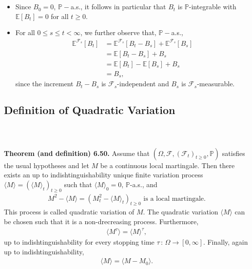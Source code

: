 \documentclass{beamer}
\numberwithin{equation}{section}
\newenvironment{frame2}{\begin{frame}\frametitle{{\normalsize \secname} \\ {\large \subsecname}}}{\end{frame}}
\begin{document}
\begin{frame2}
    \begin{itemize}
        \item Since $B_0 = 0$, $\mathbb{P}-$a.s., it follows in particular that $B_t$ is $\mathbb{P}$-integrable with $\mathbb{E}[B_t] = 0$ for all $t \geq 0$.
        \item For all $0 \leq s \leq t < \infty$, we further observe that, $\mathbb{P}-$a.s.,
        \begin{align}
            \mathbb{E}^{\mathcal{F}_s}[B_t] &= \mathbb{E}^{\mathcal{F}_s}[B_t - B_s] + \mathbb{E}^{\mathcal{F}_s}\left[B_s\right] \\
             &= \mathbb{E}[B_t - B_s] + B_s \\ 
             &= \mathbb{E}[B_t] - \mathbb{E}[B_s] + B_s \\
             &= B_s, 
        \end{align}
        since the increment $B_t - B_s$ is $\mathcal{F}_s$-independent and $B_s$ is $\mathcal{F}_s$-measurable.
    \end{itemize}
\end{frame2}

\subsection{Definition of Quadratic Variation}

\begin{frame2}
    \textbf{Theorem (and definition) 6.50.}
    Assume that $(\Omega, \mathcal{F}, (\mathcal{F}_t)_{t\geq 0},\mathbb{P})$ satisfies the usual hypotheses and let $M$ be a continuous local martingale.
    Then there exists an up to indishtinguishability unique finite variation process $\langle M \rangle = \left(\langle M \rangle_t\right)_{t\geq 0}$ such that $\langle M \rangle_0 = 0$, $\mathbb{P}$-a.s., and
    \begin{align}
        M^2 - \langle M \rangle = \left(M_t^2 - \langle M \rangle_t \right)_{t \geq 0} \text{ is a local martingale.}
    \end{align}
    This process is called quadratic variation of $M$.
    The quadratic variation $\langle M \rangle$ can be chosen such that it is a non-drecreasing process.
    Furthermore,
    \begin{align}
        \langle M^\tau \rangle = \langle M \rangle^\tau,
    \end{align}
    up to indishtinguishability for every stopping time $\tau \, : \, \Omega \rightarrow [0,\infty]$.
    Finally, again up to indishtinguishability,
    \begin{align}
        \langle M \rangle = \langle M - M_0 \rangle.
    \end{align} 
\end{frame2}
\end{document}
